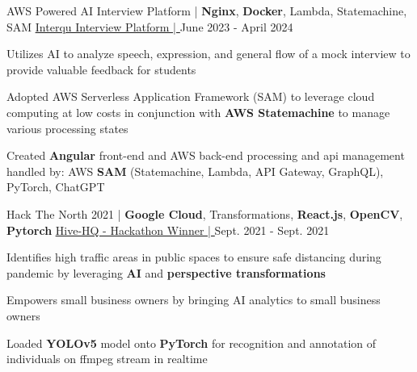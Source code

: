 \begin{cventries}
	\cventry
	{AWS Powered AI Interview Platform | \textbf{Nginx}, \textbf{Docker}, Lambda, Statemachine, SAM}
	{\underline{\href{https://github.com/Interqu}{Interqu Interview Platform | \ExternalLink}}} %
	{} %
	{June 2023 - April 2024} %
	{
		\begin{cvitems} %
			\item {Utilizes AI to analyze speech, expression, and general flow of a mock interview to provide valuable feedback for students}
			\item {Adopted AWS Serverless Application Framework (SAM) to leverage cloud computing at low costs in conjunction with \textbf{AWS Statemachine} to manage various processing states}
			\item {Created \textbf{Angular} front-end and AWS back-end processing and api management handled by: AWS \textbf{SAM} (Statemachine, Lambda, API Gateway, GraphQL), PyTorch, ChatGPT}
		\end{cvitems}
	}

	\cventry
	{Hack The North 2021 | \textbf{Google Cloud}, Transformations, \textbf{React.js}, \textbf{OpenCV}, \textbf{Pytorch}}
	{\underline{\href{https://devpost.com/software/hive-hq}{Hive-HQ - Hackathon Winner | \ExternalLink}}} %
	{} %
	{Sept. 2021 - Sept. 2021} %
	{
		\begin{cvitems} %
    \item {Identifies high traffic areas in public spaces to ensure safe distancing during pandemic by leveraging \textbf{AI} and \textbf{perspective transformations}}
			\item {Empowers small business owners by bringing AI analytics to small business owners}
			\item {Loaded \textbf{YOLOv5} model onto \textbf{PyTorch} for recognition and annotation of individuals on ffmpeg stream in realtime}
		\end{cvitems}
	}






\end{cventries}
